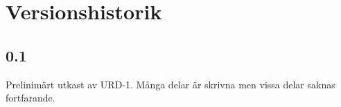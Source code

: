 \section*{Versionshistorik}

\subsection*{0.1}
Prelinimärt utkast av URD-1. Många delar är skrivna men vissa delar saknas fortfarande.